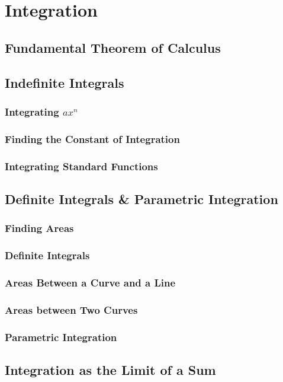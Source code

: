 \documentclass[../maths.tex]{subfiles}
\begin{document}
\chapter{Integration}
\section{Fundamental Theorem of Calculus}
\section{Indefinite Integrals}
\subsection*{Integrating \texorpdfstring{$ax^n$}{ax to the n}}
\subsection*{Finding the Constant of Integration}
\subsection*{Integrating Standard Functions}
\section{Definite Integrals \& Parametric Integration}
\subsection*{Finding Areas}
\subsection*{Definite Integrals}
\subsection*{Areas Between a Curve and a Line}
\subsection*{Areas between Two Curves}
\subsection*{Parametric Integration}
\section{Integration as the Limit of a Sum}
\end{document}
